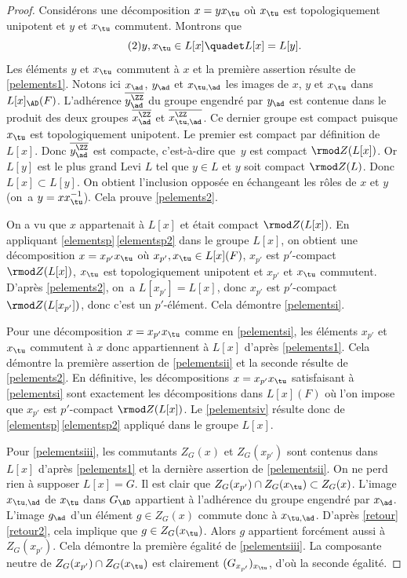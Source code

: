 \begin{proof}
Considérons une décomposition $x=yx_{\tu}$ où $x_{\tu}$ est topologiquement unipotent et $y$ et $x_{\tu}$ commutent. Montrons que
\begin{equation}\tag{2}\label{pelements2}
y,x_{\tu}\in L[x]\quadet L[x]=L[y].
\end{equation}
Les éléments $y$ et $x_{\tu}$ commutent à $x$ et la première assertion résulte de \eqref{pelements1}. Notons ici $x_{\ad}$, $y_{\ad}$ et $x_{\tu,\ad}$ les images de $x$, $y$ et $x_{\tu}$ dans $L[x]_{\AD}(F)$. L'adhérence $\overline{y_{\ad}^{\ZZ}}$ du groupe engendré par $y_{\ad}$ est contenue dans le produit des deux groupes $\overline{x_{\ad}^{\ZZ}}$ et $\overline{x_{\tu,\ad}^{\ZZ}}$. Ce dernier groupe est compact puisque $x_{\tu}$ est topologiquement unipotent. Le premier est compact par définition de $L[x]$. Donc $\overline{y_{\ad}^{\ZZ}}$ est compacte, c'est-à-dire que~$y$ est compact $\rmod Z(L[x])$. Or $L[y]$ est le plus grand Levi $L$ tel que $y\in L$ et $y$ soit compact $\rmod Z(L)$. Donc $L[x]\subset L[y]$. On obtient l'inclusion opposée en échangeant les rôles de $x$ et $y$ (on~a $y=xx_{\tu}^{-1}$). Cela prouve \eqref{pelements2}.

On a vu que $x$ appartenait à $ L[x]$ et était compact $\rmod Z(L[x])$. En appliquant \ref{elementsp}\,\eqref{elementsp2} dans le groupe $L[x]$, on obtient une décomposition $x=x_{p'}x_{\tu}$ où $x_{p'}, x_{\tu}\in L[x](F)$, $x_{p'}$ est $p'$-compact $\rmod Z(L[x])$, $x_{\tu}$ est topologiquement unipotent et $x_{p'}$ et $x_{\tu}$ commutent. D'après \eqref{pelements2}, on~a $L[x_{p'}]=L[x]$, donc $x_{p'}$ est $p'$-compact $\rmod Z(L[x_{p'}])$, donc c'est un $p'$-élément. Cela démontre \eqref{pelementsi}.

Pour une décomposition $x=x_{p'}x_{\tu}$ comme en \eqref{pelementsi}, les éléments $x_{p'}$ et $x_{\tu}$ commutent à $x$ donc appartiennent à $L[x]$ d'après \eqref{pelements1}. Cela démontre la première assertion de \eqref{pelementsii} et la seconde résulte de \eqref{pelements2}. En définitive, les décompositions $x=x_{p'}x_{\tu}$ satisfaisant à \eqref{pelementsi} sont exactement les décompositions dans $L[x](F)$ où l'on impose que $x_{p'}$ est $p'$-compact $\rmod Z(L[x])$. Le \eqref{pelementsiv} résulte donc de \ref{elementsp}\,\eqref{elementsp2} appliqué dans le groupe $L[x]$.

Pour \eqref{pelementsiii}, les commutants $Z_{G}(x)$ et $Z_{G}(x_{p'})$ sont contenus dans $L[x]$ d'après \eqref{pelements1} et la dernière assertion de \eqref{pelementsii}. On ne perd rien à supposer $L[x]=G$. Il est clair que $Z_{G}(x_{p'})\cap Z_{G}(x_{\tu})\subset Z_{G}(x)$. L'image $x_{\tu,\ad}$ de $x_{\tu}$ dans $G_{\AD}$ appartient à l'adhérence du groupe engendré par $x_{\ad}$. L'image $g_{\ad}$ d'un élément $g\in Z_{G}(x)$ commute donc à $x_{\tu,\ad}$. D'après \ref{retour}\,\eqref{retour2}, cela implique que $g\in Z_{G}(x_{\tu})$. Alors $g$ appartient forcément aussi à $Z_{G}(x_{p'})$. Cela démontre la première égalité de \eqref{pelementsiii}. La composante neutre de $Z_{G}(x_{p'})\cap Z_{G}(x_{\tu})$ est clairement $(G_{x_{p'}})_{x_{\tu}}$, d'où la seconde égalité.
\end{proof}

